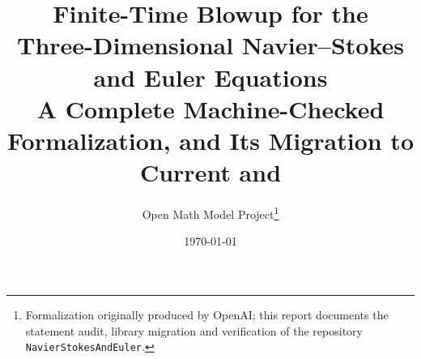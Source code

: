\documentclass[11pt,a4paper]{article}
\title{\bfseries Finite-Time Blowup for the\\ Three-Dimensional Navier--Stokes and Euler Equations\\[4pt]
\large A Complete Machine-Checked Formalization, and Its Migration to\\
Current \Mathlib{} and \TauCeti{}}
\author{Open Math Model Project\thanks{Formalization originally produced by OpenAI;
this report documents the statement audit, library migration and verification of the
repository \texttt{NavierStokesAndEuler}.}}
\date{\today}
\theoremstyle{plain}
\theoremstyle{definition}
\begin{document}
\maketitle

\begin{abstract}

\end{abstract}

\tableofcontents
\newpage












\appendix





\end{document}

